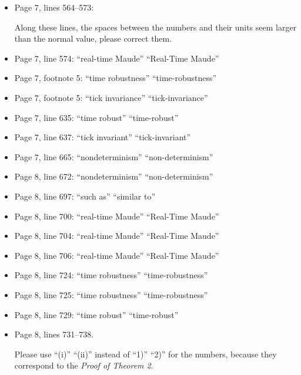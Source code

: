 \documentclass[12pt,onecolumn]{IEEEtranTIE}
\begin{document}
\begin{itemize}
\item Page 7, lines 564--573:

Along these lines, the spaces between the numbers and their units seem
larger than the normal value, please correct them.

\item Page 7, line 574: ``real-time Maude'' \by ``Real-Time Maude''

\item Page 7, footnote 5: ``time robustness'' \by ``time-robustness''

\item Page 7, footnote 5: ``tick invariance'' \by ``tick-invariance''
  
\item Page 7, line 635: ``time robust'' \by ``time-robust''

\item Page 7, line 637: ``tick invariant'' \by ``tick-invariant''

\item Page 7, line 665: ``nondeterminism'' \by ``non-determinism''

\item Page 8, line 672: ``nondeterminism'' \by ``non-determinism''

\item Page 8, line 697: ``such as'' \by ``similar to''

\item Page 8, line 700: ``real-time Maude'' \by ``Real-Time Maude''

\item Page 8, line 704: ``real-time Maude'' \by ``Real-Time Maude''

\item Page 8, line 706: ``real-time Maude'' \by ``Real-Time Maude''

\item Page 8, line 724: ``time robustness'' \by ``time-robustness''

\item Page 8, line 725: ``time robustness'' \by ``time-robustness''

\item Page 8, line 729: ``time robust'' \by ``time-robust''

\item Page 8, lines 731--738. 

Please use ``(i)'' ``(ii)'' instead of ``1)'' ``2)'' for the numbers,
because they correspond to the \emph{Proof of Theorem 2}.


\end{itemize}
\end{document}
